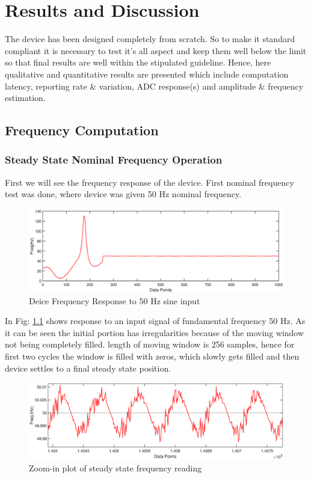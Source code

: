 \chapter{Results and Discussion}
The device has been designed completely from scratch. So to make it standard compliant it is necessary to test it's all aspect and keep them well below the limit so that final results are well within the stipulated guideline. Hence, here qualitative and quantitative results are presented which include computation latency, reporting rate \& variation, ADC response(s) and amplitude \& frequency estimation.

\section{Frequency Computation}
\subsection{Steady State Nominal Frequency Operation}
First we will see the frequency response of the device. First nominal frequency test was done, where device was given 50 Hz nominal frequency.
\begin{figure}[h]
	\includegraphics[width=\textwidth]{fig/50Hz_freq_1000samples.eps}
	\caption{Deice Frequency Response to 50 Hz sine input}
	\label{fig:50hzlongdata}
\end{figure}

In Fig: \ref{fig:50hzlongdata} shows response to an input signal of fundamental frequency 50 Hz. As it can be seen the initial portion has irregularities because of the moving window not being completely filled. length of moving window is 256 samples, hence for first two cycles the window is filled with zeros, which slowly gets filled and then device settles to a final steady state position.

\begin{figure}[h]
	\includegraphics[width=\textwidth]{fig/50Hz_freq_closeup.eps}
	\caption{Zoom-in plot of steady state frequency reading}
	\label{fig:50Hzcloseup}
\end{figure}



